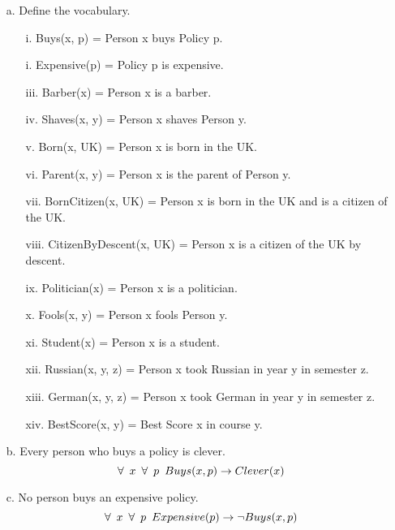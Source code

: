 \documentclass[11pt]{article}
\begin{document}
\begin{flushleft}
\begin{enumerate}
    \item[a.] Define the vocabulary.
        \begin{enumerate} 
            \item[i.] Buys(x, p) = Person x buys Policy p.
            \item[i.] Expensive(p) = Policy p is expensive.
            \item[iii.] Barber(x) = Person x is a barber.
            \item[iv.] Shaves(x, y) = Person x shaves Person y.
            \item[v.] Born(x, UK) = Person x is born in the UK.
            \item[vi.] Parent(x, y) = Person x is the parent of Person y.
            \item[vii.] BornCitizen(x, UK) = Person x is born in the UK and
                is a citizen of the UK.
            \item[viii.] CitizenByDescent(x, UK) = Person x is a citizen of
                the UK by descent.
            \item[ix.] Politician(x) = Person x is a politician.
            \item[x.] Fools(x, y) = Person x fools Person y.
            \item[xi.] Student(x) = Person x is a student.
            \item[xii.] Russian(x, y, z) = Person x took Russian in year y
                in semester z.
            \item[xiii.] German(x, y, z) = Person x took German in year y
                in semester z.
            \item[xiv.] BestScore(x, y) = Best Score x in course y.
        \end{enumerate}
    \item[b.] Every person who buys a policy is clever.
        $$ \forall \hspace{0.5em} x \hspace{0.5em} \forall \hspace{0.5em} p \hspace{0.5em}
        Buys(x, p) \rightarrow Clever(x) $$

    \item[c.] No person buys an expensive policy.
        $$ \forall \hspace{0.5em} x \hspace{0.5em} \forall \hspace{0.5em} p \hspace{0.5em}
        Expensive(p) \rightarrow \neg Buys(x, p) $$


\end{enumerate}
\end{flushleft}
\end{document}
